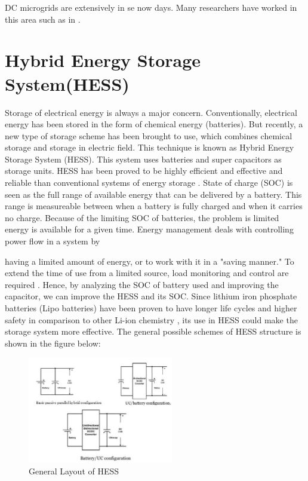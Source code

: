 \documentclass[journal,twoside]{IEEEtran}
\begin{document}
\bigskip
DC microgrids are extensively in se now days.
Many researchers have worked in this area such as in \cite{Chen2015, Piagi2006, Lee2015, Madduri2015, Vosoloo2050, Liu2015, Giacomini2015, Latreche2015, Yahyaoui2015}.


\section{Hybrid Energy Storage System(HESS)}
Storage of electrical energy is always a major
concern. Conventionally, electrical energy has been
stored in the form of chemical energy (batteries). But
recently, a new type of storage scheme has been
brought to use, which combines chemical storage and
storage in electric field. This technique is known as
Hybrid Energy Storage System (HESS). This system
uses batteries and super capacitors as storage units.
HESS has been proved to be highly efficient and
effective and reliable than conventional systems of
energy storage \cite{Yahyaoui2015, Ismail2013}.
State of charge (SOC) is seen as the full range
of available energy that can be delivered by a battery.
This range is measureable between when a battery is
fully charged and when it carries no charge. Because of
the limiting SOC of batteries, the problem is limited
energy is available for a given time. Energy management deals with controlling power flow in a system by

having a limited amount of energy, or to work with it
in a "saving manner." To extend the time of use from a
limited source, load monitoring and control are required \cite{Michaelson2050}. Hence, by analyzing the SOC of battery
used and improving the capacitor, we can improve the
HESS and its SOC.
Since lithium iron phosphate batteries (Lipo batteries) have been proven to have longer life cycles
and higher safety in comparison to other Li-ion chemistry \cite{Lithium2050}, its use in HESS could make the storage system more effective.
The general possible schemes of HESS
structure is shown in the figure below:

\begin{figure}[!ht]
\centering
\includegraphics[width=2.5in]{3}
\caption{General Layout of HESS}
\label{f3}
\end{figure}
\end{document}
